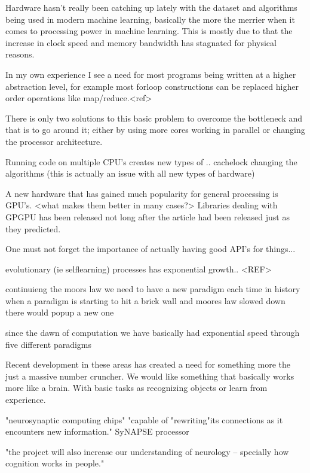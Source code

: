 \documentclass{article}
\begin{document}
    Hardware hasn't really been catching up lately with the dataset and algorithms
    being used in modern machine learning, basically the more the merrier when it comes
    to processing power in machine learning. This is mostly due to that the
    increase in clock speed and memory bandwidth has stagnated for physical
    reasons.
    
    In my own experience I see a need for most programs being written at
    a higher abstraction level, for example most forloop constructions can be
    replaced higher order operations like map/reduce.<ref> 

    There is only two solutions to this basic problem to overcome the
    bottleneck and that is to go around it; either by using more cores working in
    parallel or changing the processor architecture.

    Running code on multiple CPU's creates new types of .. 
    cachelock
    changing the algorithms (this is actually an issue with all new types of
    hardware)

    A new hardware that has gained much popularity for general processing is
    GPU's. <what makes them better in many cases?> 
    Libraries dealing with GPGPU has been released not long after the
    article\cite{ms2020} had been released just as they predicted.

    One must not forget the importance of actually having good API's for
    things...




evolutionary (ie selflearning) processes has exponential growth.. <REF>




continuieng the moors law we need to have a new paradigm
each time in history when a paradigm is starting to hit a brick wall and
moores law slowed down there would popup a new one

since the dawn of computation we have basically had exponential speed through
five different paradigms


Recent development in these areas has created a need for something more the
just a massive number cruncher. We would like something that basically works
more like a brain. With basic tasks as recognizing objects or learn from
experience.
\cite{synapse}

"neurosynaptic computing chips" 
"capable of "rewriting"its connections as it
encounters new information."
SyNAPSE processor

"the project will also increase our understanding of neurology -- specially how
cognition works in people."
\end{document}
